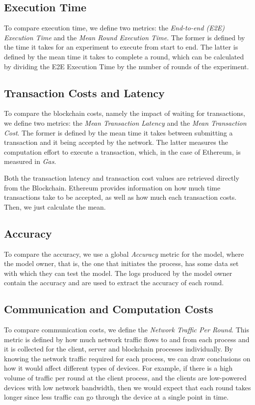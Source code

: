 \subsection{Execution Time}

To compare execution time, we define two metrics: the \textit{End-to-end (E2E) Execution Time} and the \textit{Mean Round Execution Time}. The former is defined by the time it takes for an experiment to execute from start to end. The latter is defined by the mean time it takes to complete a round, which can be calculated by dividing the E2E Execution Time by the number of rounds of the experiment.

\subsection{Transaction Costs and Latency}

To compare the blockchain costs, namely the impact of waiting for transactions, we define two metrics: the \textit{Mean Transaction Latency} and the \textit{Mean Transaction Cost}. The former is defined by the mean time it takes between submitting a transaction and it being accepted by the network. The latter measures the computation effort to execute a transaction, which, in the case of Ethereum, is measured in \textit{Gas}.

Both the transaction latency and transaction cost values are retrieved directly from the Blockchain. Ethereum provides information on how much time transactions take to be accepted, as well as how much each transaction costs. Then, we just calculate the mean.

\subsection{Accuracy}

To compare the accuracy, we use a global \textit{Accuracy} metric for the model, where the model owner, that is, the one that initiates the process, has some data set with which they can test the model. The logs produced by the model owner contain the accuracy and are used to extract the accuracy of each round.

\subsection{Communication and Computation Costs}

To compare communication costs, we define the \textit{Network Traffic Per Round}. This metric is defined by how much network traffic flows to and from each process and it is collected for the client, server and blockchain processes individually. By knowing the network traffic required for each process, we can draw conclusions on how it would affect different types of devices. For example, if there is a high volume of traffic per round at the client process, and the clients are low-powered devices with low network bandwidth, then we would expect that each round takes longer since less traffic can go through the device at a single point in time.

